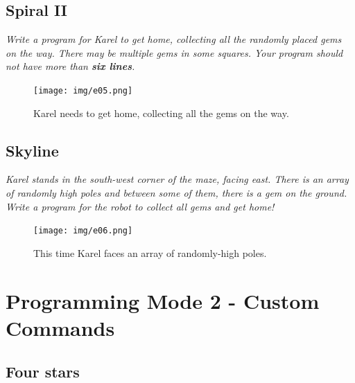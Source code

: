 \subsection{Spiral II}

{\em Write a program for Karel to get home, collecting all the randomly placed 
gems on the way. There may be multiple gems in some squares. 
Your program should not have more than {\bf six lines}.}

\begin{figure}[!ht]
\begin{center}
\texttt{[image: img/e05.png]}
\end{center}
\vspace{-4mm}
\caption{Karel needs to get home, collecting all the gems on the way.}
\label{fig:e05}
\vspace{-10mm}
\end{figure}
\newpage



\subsection{Skyline}

{\em Karel stands in the south-west corner of the maze, facing east. There 
is an array of randomly high poles and between some of them, there is a gem
on the ground. Write a program for the robot to collect all gems and get 
home!}\\[-7mm]


\begin{figure}[!ht]
\begin{center}
\texttt{[image: img/e06.png]}
\end{center}
\vspace{-4mm}
\caption{This time Karel faces an array of randomly-high poles.}
\label{fig:e06}
\vspace{-10mm}
\end{figure}


\section{Programming Mode 2 - Custom Commands}

\subsection{Four stars}

